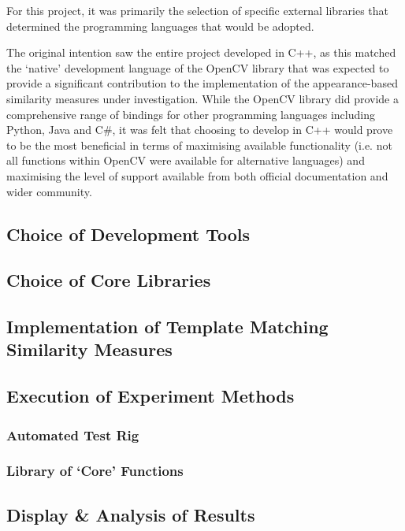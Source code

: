 For this project, it was primarily the selection of specific external libraries that determined the programming languages that would be adopted.

The original intention saw the entire project developed in C++, as this matched the `native' development language of the OpenCV library \cite{opencv} that was expected to provide a significant contribution to the implementation of the appearance-based similarity measures under investigation. While the OpenCV library did provide a comprehensive range of bindings for other programming languages including Python, Java and C\#, it was felt that choosing to develop in C++ would prove to be the most beneficial in terms of maximising available functionality (i.e. not all functions within OpenCV were available for alternative languages) and maximising the level of support available from both official documentation and wider community. 

\subsection{Choice of Development Tools}

\subsection{Choice of Core Libraries}

\subsection{Implementation of Template Matching Similarity Measures}

\subsection{Execution of Experiment Methods}

\subsubsection{Automated Test Rig}

\subsubsection{Library of `Core' Functions}

\subsection{Display \& Analysis of Results}

